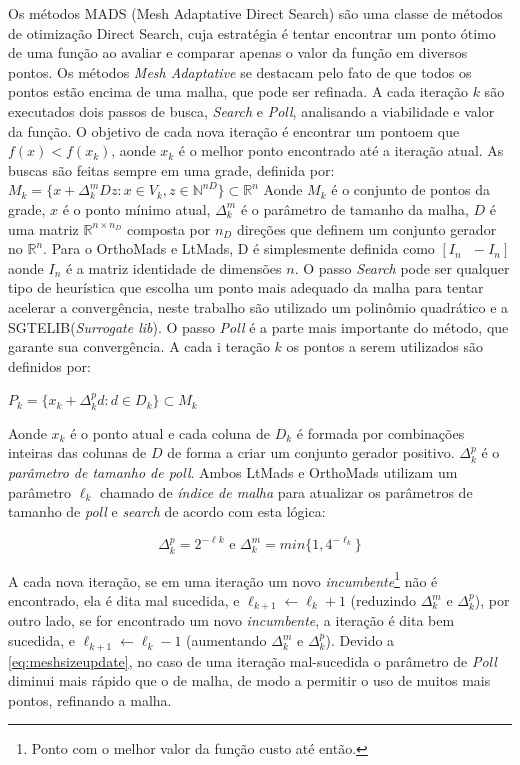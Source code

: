 Os métodos MADS (Mesh Adaptative Direct Search) são uma classe de métodos de otimização Direct Search, cuja estratégia é tentar encontrar um ponto ótimo de uma função ao avaliar e comparar apenas o valor da função em diversos pontos.\cite{AuDe2006}
%
Os métodos \textit{Mesh Adaptative} se destacam pelo fato de que todos os pontos estão encima de uma malha, que pode ser refinada.
%
A cada iteração $ k $ são executados dois passos de busca, \textit{Search} e \textit{Poll}, analisando a viabilidade e valor da função. O objetivo de cada nova iteração é encontrar um pontoem que $f(x) < f(x_k)$, aonde $x_k$ é o melhor ponto encontrado até a iteração atual. 
%
As buscas são feitas sempre em uma grade, definida por:
%
$M_k = \{x + \Delta^m_kDz : x \in V_k, z \in \mathbb{N}^{nD} \} \subset \mathbb{R}^n$
Aonde $M_k$ é o conjunto de pontos da grade, $x$ é o ponto mínimo atual, $\Delta^m_k$ é o parâmetro de tamanho da malha, $D$ é uma matriz $\mathbb{R}^{n \times n_D}$ composta por $n_D$ direções que definem um conjunto gerador no $\mathbb{R}^n$. Para o OrthoMads e LtMads, D é simplesmente definida como $[I_n\text{ } -I_n]$ aonde $I_n$ é a matriz identidade de dimensões $n$.
%
O passo \textit{Search} pode ser qualquer tipo de heurística que escolha um ponto mais adequado da malha para tentar acelerar a convergência, neste trabalho são utilizado um polinômio quadrático e a SGTELIB(\textit{Surrogate lib}).
%
O passo \textit{Poll} é a parte mais importante do método, que garante sua convergência. A cada i	teração $k$ os pontos a serem utilizados são definidos por:
%
\begin{center}
$P_k = \{ x_k + \Delta^p_kd : d \in D_k\} \subset M_k$
\end{center}
%
Aonde  $x_k$ é o ponto atual e cada coluna de $D_k$ é formada por combinações inteiras das colunas de $D$ de forma a criar um conjunto gerador positivo. $\Delta^p_k$ é o \textit{parâmetro de tamanho de \textit{poll}}.
%
Ambos LtMads e OrthoMads utilizam um parâmetro $\ell_k$ chamado de \textit{índice de malha} para atualizar os parâmetros de tamanho de \textit{poll} e \textit{search} de acordo com esta lógica:


\begin{equation} \label{eq:meshsizeupdate}
\Delta^p_k = 2^{-\ell k} \text{ e }  \Delta^m_k = min\{1, 4^{-\ell_k}\}
\end{equation}

A cada nova iteração, se em uma iteração um novo \textit{incumbente}\footnote{Ponto com o melhor valor da função custo até então.} não é encontrado, ela é dita mal sucedida, e $\ell_{k+1} \gets \ell_k +1$ (reduzindo $\Delta^m_k$ e $\Delta^p_k$), por outro lado, se for encontrado um novo \textit{incumbente}, a iteração é dita bem sucedida, e $\ell_{k+1} \gets \ell_k -1$ (aumentando $\Delta^m_k$ e $\Delta^p_k$). Devido a \ref{eq:meshsizeupdate}, no caso de uma iteração mal-sucedida o parâmetro de \textit{Poll} diminui mais rápido que o de malha, de modo a permitir o uso de muitos mais pontos, refinando a malha.


